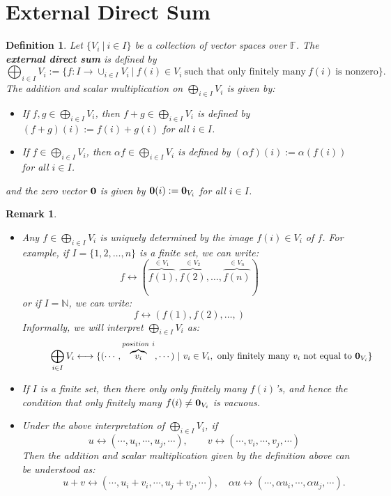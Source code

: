\documentclass[12pt]{amsbook}
\newtheorem{definition}[theorem]{Definition}
\newtheorem{remark}[theorem]{Remark}
\begin{document}
\section{External Direct Sum} \label{sec-extdirectsum}
\begin{definition}
Let $\{V_i\ |\ i \in I\}$ be a collection of vector spaces over $\mathbb{F}$. The {\bf external direct sum} is defined by
$$\bigoplus_{i \in I} V_i := \{f: I \to \cup_{i \in I} V_i \ |\ f(i) \in V_i \ \text{such that only finitely many}\ f(i)\ \text{is nonzero}\}.$$
The addition and scalar multiplication on $\bigoplus_{i \in I} V_i$ is given by:
\begin{itemize}
\item If $f, g \in \bigoplus_{i \in I} V_i$, then $f+g \in \bigoplus_{i \in I} V_i$ is defined by $(f+g)(i) := f(i)+g(i)$ for all $i \in I$.
\item If $f \in \bigoplus_{i \in I} V_i$, then $\alpha f \in \bigoplus_{i \in I} V_i$ is defined by $(\alpha f)(i) := \alpha(f(i))$ for all $i \in I$.
\end{itemize}
and the zero vector ${\bf 0}$ is given by ${\bf 0}(i) := {\bf 0}_{V_i}$ for all $i \in I$.
\end{definition}

\begin{remark}\
    \begin{itemize}
        \item Any $f \in \bigoplus_{i \in I} V_i$ is uniquely determined by the image $f(i) \in V_i$ of $f$. For example, if $I = \{1,2,  \dots, n\}$ is a finite set, we can write:
        $$f \longleftrightarrow (\overbrace{f(1)}^{\in V_1}, \overbrace{f(2)}^{\in V_2}, \dots, \overbrace{f(n)}^{\in V_n})$$
        or if $I = \mathbb{N}$, we can write:
        $$f \longleftrightarrow (f(1), f(2), \dots, )$$
        Informally, we will interpret $\bigoplus_{i \in I} V_i$ as:
        $$\quad \quad \quad \bigoplus_{i \in I} V_i \longleftrightarrow \{ (\cdots, \overbrace{v_i}^{position\ i}, \cdots )\ |\ v_i \in V_i,\ \text{only finitely many}\ v_i\ \text{not equal to}\ {\bf 0}_{V_i}\}$$

        \item If $I$ is a finite set, then there only only finitely many $f(i)$'s, and hence the condition that only finitely many $f(i) \neq {\bf 0}_{V_i}$ is vacuous.

        \item Under the above interpretation of $\bigoplus_{i \in I} V_i$, if
        $$\quad u \longleftrightarrow (\cdots, u_i, \cdots, u_j, \cdots ),\quad \quad v \longleftrightarrow (\cdots, v_i, \cdots, v_j, \cdots )$$
        Then the addition and scalar multiplication given by the definition above can be understood as:
        $$\quad \quad \quad u+v \longleftrightarrow (\cdots, u_i + v_i, \cdots, u_j+v_j, \cdots ), \quad \alpha u \longleftrightarrow (\cdots, \alpha u_i, \cdots, \alpha u_j, \cdots ).$$
    \end{itemize}
\end{remark}
\end{document}
